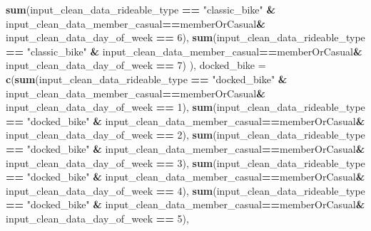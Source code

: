 \documentclass[
]{article}
\newenvironment{Shaded}{\begin{snugshade}}{\end{snugshade}}
\newcommand{\AttributeTok}[1]{\textcolor[rgb]{0.13,0.29,0.53}{#1}}
\newcommand{\DecValTok}[1]{\textcolor[rgb]{0.00,0.00,0.81}{#1}}
\newcommand{\FunctionTok}[1]{\textcolor[rgb]{0.13,0.29,0.53}{\textbf{#1}}}
\newcommand{\NormalTok}[1]{#1}
\newcommand{\SpecialCharTok}[1]{\textcolor[rgb]{0.81,0.36,0.00}{\textbf{#1}}}
\newcommand{\StringTok}[1]{\textcolor[rgb]{0.31,0.60,0.02}{#1}}
\begin{document}
\begin{Shaded}
\begin{Highlighting}[]
                                        \FunctionTok{sum}\NormalTok{(input\_clean\_data\_rideable\_type }\SpecialCharTok{==} \StringTok{"classic\_bike"} \SpecialCharTok{\&}\NormalTok{ input\_clean\_data\_member\_casual}\SpecialCharTok{==}\NormalTok{memberOrCasual}\SpecialCharTok{\&}\NormalTok{ input\_clean\_data\_day\_of\_week }\SpecialCharTok{==} \DecValTok{6}\NormalTok{),}
                                        \FunctionTok{sum}\NormalTok{(input\_clean\_data\_rideable\_type }\SpecialCharTok{==} \StringTok{"classic\_bike"} \SpecialCharTok{\&}\NormalTok{ input\_clean\_data\_member\_casual}\SpecialCharTok{==}\NormalTok{memberOrCasual}\SpecialCharTok{\&}\NormalTok{ input\_clean\_data\_day\_of\_week }\SpecialCharTok{==} \DecValTok{7}\NormalTok{)}
\NormalTok{                                        ),}
                       \AttributeTok{docked\_bike =} \FunctionTok{c}\NormalTok{(}\FunctionTok{sum}\NormalTok{(input\_clean\_data\_rideable\_type }\SpecialCharTok{==} \StringTok{"docked\_bike"} \SpecialCharTok{\&}\NormalTok{ input\_clean\_data\_member\_casual}\SpecialCharTok{==}\NormalTok{memberOrCasual}\SpecialCharTok{\&}\NormalTok{ input\_clean\_data\_day\_of\_week }\SpecialCharTok{==} \DecValTok{1}\NormalTok{),}
                                       \FunctionTok{sum}\NormalTok{(input\_clean\_data\_rideable\_type }\SpecialCharTok{==} \StringTok{"docked\_bike"} \SpecialCharTok{\&}\NormalTok{ input\_clean\_data\_member\_casual}\SpecialCharTok{==}\NormalTok{memberOrCasual}\SpecialCharTok{\&}\NormalTok{ input\_clean\_data\_day\_of\_week }\SpecialCharTok{==} \DecValTok{2}\NormalTok{),}
                                       \FunctionTok{sum}\NormalTok{(input\_clean\_data\_rideable\_type }\SpecialCharTok{==} \StringTok{"docked\_bike"} \SpecialCharTok{\&}\NormalTok{ input\_clean\_data\_member\_casual}\SpecialCharTok{==}\NormalTok{memberOrCasual}\SpecialCharTok{\&}\NormalTok{ input\_clean\_data\_day\_of\_week }\SpecialCharTok{==} \DecValTok{3}\NormalTok{),}
                                       \FunctionTok{sum}\NormalTok{(input\_clean\_data\_rideable\_type }\SpecialCharTok{==} \StringTok{"docked\_bike"} \SpecialCharTok{\&}\NormalTok{ input\_clean\_data\_member\_casual}\SpecialCharTok{==}\NormalTok{memberOrCasual}\SpecialCharTok{\&}\NormalTok{ input\_clean\_data\_day\_of\_week }\SpecialCharTok{==} \DecValTok{4}\NormalTok{),}
                                       \FunctionTok{sum}\NormalTok{(input\_clean\_data\_rideable\_type }\SpecialCharTok{==} \StringTok{"docked\_bike"} \SpecialCharTok{\&}\NormalTok{ input\_clean\_data\_member\_casual}\SpecialCharTok{==}\NormalTok{memberOrCasual}\SpecialCharTok{\&}\NormalTok{ input\_clean\_data\_day\_of\_week }\SpecialCharTok{==} \DecValTok{5}\NormalTok{),}

\end{Highlighting}
\end{Shaded}
\end{document}
